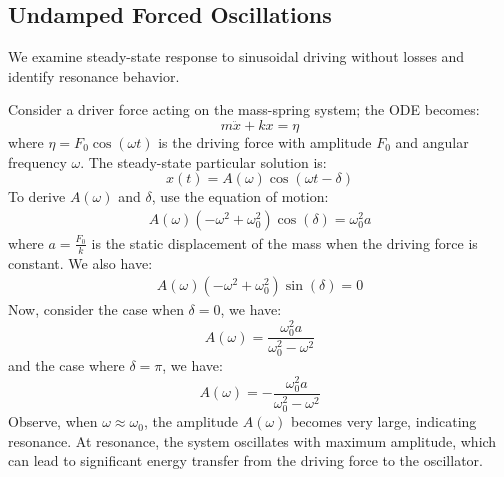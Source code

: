 \documentclass[11pt]{report}
\begin{document}
\subsection{Undamped Forced Oscillations}
We examine steady-state response to sinusoidal driving without losses and identify resonance behavior.
\begin{definition}
    Consider a driver force acting on the mass-spring system; the ODE becomes:
    \begin{equation}
        m\ddot{x} + kx = \eta
    \end{equation}
    where \( \eta = F_0 \cos(\omega t) \) is the driving force with amplitude \( F_0 \) and angular frequency \( \omega \). The steady-state particular solution is:
    \begin{equation}
        x(t) = A(\omega)\cos(\omega t - \delta) 
    \end{equation}
    To derive $A(\omega)$ and $\delta$, use the equation of motion:
    \begin{align*}
        A(\omega)(-\omega^2 + \omega_0^2) \cos(\delta) = \omega_0^2 a
    \end{align*}
    where \( a = \frac{F_0}{k} \) is the static displacement of the mass when the driving force is constant. We also have:
    \begin{align*}
        A(\omega)(-\omega^2 + \omega_0^2) \sin(\delta) = 0
    \end{align*}
    Now, consider the case when $\delta = 0$, we have:
    \begin{equation}
        A(\omega) = \frac{\omega_0^2 a}{\omega_0^2 - \omega^2}
    \end{equation}
    and the case where \( \delta = \pi \), we have:
    \begin{equation}
        A(\omega) = -\frac{\omega_0^2 a}{\omega_0^2 - \omega^2}
    \end{equation}
    Observe, when $\omega \approx \omega_0$, the amplitude \( A(\omega) \) becomes very large, indicating resonance. At resonance, the system oscillates with maximum amplitude, which can lead to significant energy transfer from the driving force to the oscillator.
\end{definition}
\end{document}
